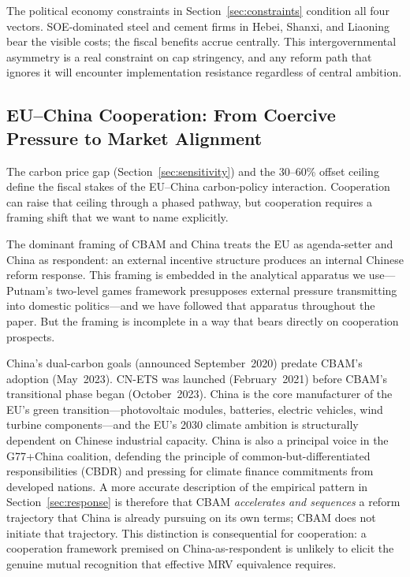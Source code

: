 \documentclass[letterpaper, 10pt, conference]{ieeeconf}
\begin{document}
The political economy constraints in Section~\ref{sec:constraints}
condition all four vectors. SOE-dominated steel and cement firms in
Hebei, Shanxi, and Liaoning bear the visible costs; the fiscal
benefits accrue centrally. This intergovernmental asymmetry is a
real constraint on cap stringency, and any reform path that ignores
it will encounter implementation resistance regardless of central
ambition.

\subsection{EU--China Cooperation: From Coercive Pressure to Market Alignment}
\label{sec:cooperation}

The carbon price gap (Section~\ref{sec:sensitivity}) and the 30--60\%
offset ceiling \citep{Li2026} define the fiscal stakes of the
EU--China carbon-policy interaction. Cooperation can raise that
ceiling through a phased pathway, but cooperation requires a framing
shift that we want to name explicitly.

The dominant framing of CBAM and China treats the EU as agenda-setter
and China as respondent: an external incentive structure produces an
internal Chinese reform response. This framing is embedded in the
analytical apparatus we use---Putnam's two-level games framework
presupposes external pressure transmitting into domestic
politics---and we have followed that apparatus throughout the paper.
But the framing is incomplete in a way that bears directly on
cooperation prospects.

China's dual-carbon goals (announced September~2020) predate CBAM's
adoption (May~2023). CN-ETS was launched (February~2021) before
CBAM's transitional phase began (October~2023). China is the core
manufacturer of the EU's green transition---photovoltaic modules,
batteries, electric vehicles, wind turbine components---and the EU's
2030 climate ambition is structurally dependent on Chinese industrial
capacity. China is also a principal voice in the G77+China coalition,
defending the principle of common-but-differentiated responsibilities
(CBDR) and pressing for climate finance commitments from developed
nations. A more accurate description of the empirical pattern in
Section~\ref{sec:response} is therefore that CBAM \emph{accelerates
and sequences} a reform trajectory that China is already pursuing on
its own terms; CBAM does not initiate that trajectory. This
distinction is consequential for cooperation: a cooperation framework
premised on China-as-respondent is unlikely to elicit the genuine
mutual recognition that effective MRV equivalence requires.
\end{document}
